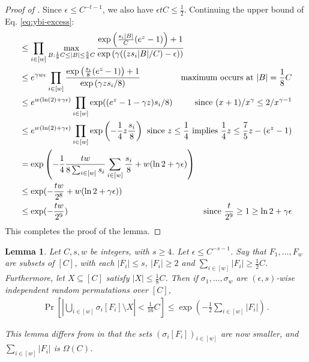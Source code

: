 \documentclass[10pt]{article}
\newtheorem{lemma}[theorem]{Lemma}
\theoremstyle{definition}\newtheorem{definition}[lemma]{Definition}
\theoremstyle{remark}  \newtheorem*{remark}{Remark}
\begin{document}
\begin{proof}[Proof of ]
  Since $\epsilon \le C^{-t-1}$, we also have $\epsilon t C \le \frac{1}{2}$. Continuing the upper bound of Eq. \ref{eq:ybi-excess}:
  \begin{align*}
    &\le \prod_{i \in [w]} \max_{B: \frac{1}{8} C \le |B| \le \frac{5}{8} C} \frac{\exp\left({\frac{s_i |B|}{C} (e^z - 1)} \right) + 1}{\exp\left(\gamma ((z s_i |B| / C) - \epsilon) \right) } \hspace{-2cm} \\
    &\le e^{\gamma w \epsilon} \prod_{i \in [w]} \frac{\exp\left({\frac{s_i}{8} (e^z - 1)} \right) + 1}{\exp\left(\gamma z s_i / 8 \right) }  &\text{maximum occurs at $|B| = \frac{1}{8} C$}\\
    &\le e^{w (\ln(2) + \gamma \epsilon)} \prod_{i \in [w]} \exp( (e^z - 1 - \gamma z) s_i / 8 )  &\text{since $(x+1)/x^\gamma \le 2/x^{\gamma -1}$} \\
    &\le e^{w (\ln(2) + \gamma \epsilon)} \prod_{i \in [w]} \exp\left( -\frac{1}{4} z \frac{s_i}{8} \right)  &\hspace{-4cm}\text{since $z \le \frac{1}{4}$ implies $\frac{1}{4} z \le \frac{7}{5} z - (e^z-1)$} \\
    & = \exp\left( - \frac{1}{4} \frac{t w}{8 \sum_{i \in [w]} s_i} \sum_{i \in [w]} \frac{s_i}{8}  + w (\ln 2 + \gamma \epsilon)\right) \hspace{-2cm} \\
    &\le \exp( - \frac{t w}{2^8}  + w (\ln 2 + \gamma \epsilon)) \\
    &\le \exp( - \frac{t w}{2^9})  &\text{since $\frac{t}{2^9} \ge 1 \ge \ln 2 + \gamma \epsilon$}
  \end{align*}
  This completes the proof of the lemma.
\end{proof}

\begin{lemma}\label{lem:approx-indep-small-anticoncentration}
  Let $C,s,w$ be integers, with $s \ge 4$. Let $\epsilon \le C^{-s - 1}$. Say that $F_1,\ldots,F_w$ are subsets of $[C]$, with each $|F_i| \le s$, $|F_i| \ge 2$ and $\sum_{i \in [w]} |F_i| \ge \frac{1}{2} C$. Furthermore, let $X \subseteq [C]$ satisfy $|X| \le \frac{1}{8} C$. Then if $\sigma_1,\ldots,\sigma_w$ are $(\epsilon,s)$-wise independent random permutations over $[C]$,
  \begin{align*}
    \Pr\left[\left| \bigcup_{i \in [w]} \sigma_i[F_i] \setminus X \right| < \frac{1}{16} C \right] \le \exp(- \frac{1}{2} \sum_{i \in[w]} |F_i|) \,.
  \end{align*}
  
  This lemma differs from  in that the sets $(\sigma_i[F_i])_{i \in [w]}$ are now smaller, and $\sum_{i\in[w]} |F_i|$ is $\Omega(C)$.
\end{lemma}
\end{document}
